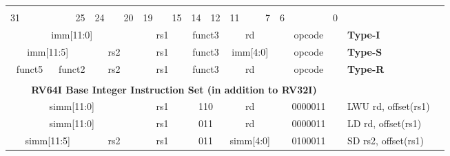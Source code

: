 \documentclass{report}
\begin{document}
\begin{table}[p]
\begin{small}
\begin{center}
\begin{tabular}{p{0.05mm}p{0.05mm}p{0.05mm}p{0.05mm}p{0.05mm}p{0.05mm}p{0.05mm}p{0.05mm}p{0.05mm}p{0.05mm}p{0.05mm}p{0.05mm}p{0.05mm}p{0.05mm}p{0.05mm}p{0.05mm}p{0.05mm}p{0.05mm}p{0.05mm}p{0.05mm}p{0.05mm}p{0.05mm}p{0.05mm}p{0.05mm}p{0.05mm}p{0.05mm}p{0.05mm}p{0.05mm}p{0.05mm}p{0.05mm}p{0.05mm}p{0.05mm}p{50mm}l}& & & & & & & & & & & & & & & & & & & & & & & & & & & & & & & & & \\
\multicolumn{3}{l}{\scriptsize{31}} & \multicolumn{4}{r}{\scriptsize{25}} & \multicolumn{2}{l}{\scriptsize{24}} & \multicolumn{3}{r}{\scriptsize{20}} & \multicolumn{2}{l}{\scriptsize{19}} & \multicolumn{3}{r}{\scriptsize{15}} & \multicolumn{1}{l}{\scriptsize{14}} & \multicolumn{2}{r}{\scriptsize{12}} & \multicolumn{2}{l}{\scriptsize{11}} & \multicolumn{3}{r}{\scriptsize{7}} & \multicolumn{3}{l}{\scriptsize{6}} & \multicolumn{4}{r}{\scriptsize{0}} &  \\
\cline{1-32}
\multicolumn{12}{|c|}{imm[11:0]} & \multicolumn{5}{c|}{rs1} & \multicolumn{3}{c|}{funct3} & \multicolumn{5}{c|}{rd} & \multicolumn{7}{c|}{opcode} & \scriptsize{\bf Type-I} \\
\cline{1-32}
\multicolumn{7}{|c|}{imm[11:5]} & \multicolumn{5}{c|}{rs2} & \multicolumn{5}{c|}{rs1} & \multicolumn{3}{c|}{funct3} & \multicolumn{5}{c|}{imm[4:0]} & \multicolumn{7}{c|}{opcode} & \scriptsize{\bf Type-S} \\
\cline{1-32}
\multicolumn{5}{|c|}{funct5} & \multicolumn{2}{c|}{funct2} & \multicolumn{5}{c|}{rs2} & \multicolumn{5}{c|}{rs1} & \multicolumn{3}{c|}{funct3} & \multicolumn{5}{c|}{rd} & \multicolumn{7}{c|}{opcode} & \scriptsize{\bf Type-R} \\
\cline{1-32}
\tabularnewline
\multicolumn{32}{c}{\bf RV64I Base Integer Instruction Set (in addition to RV32I) } & \\
\cline{1-32}
\multicolumn{12}{|c|}{simm[11:0]} & \multicolumn{5}{c|}{rs1} & \multicolumn{3}{c|}{110} & \multicolumn{5}{c|}{rd} & \multicolumn{7}{c|}{0000011} & \scriptsize{LWU rd, offset(rs1)} \\
\cline{1-32}
\multicolumn{12}{|c|}{simm[11:0]} & \multicolumn{5}{c|}{rs1} & \multicolumn{3}{c|}{011} & \multicolumn{5}{c|}{rd} & \multicolumn{7}{c|}{0000011} & \scriptsize{LD rd, offset(rs1)} \\
\cline{1-32}
\multicolumn{7}{|c|}{simm[11:5]} & \multicolumn{5}{c|}{rs2} & \multicolumn{5}{c|}{rs1} & \multicolumn{3}{c|}{011} & \multicolumn{5}{c|}{simm[4:0]} & \multicolumn{7}{c|}{0100011} & \scriptsize{SD rs2, offset(rs1)} \\

\end{tabular}
\end{center}
\end{small}
\end{table}
\end{document}
